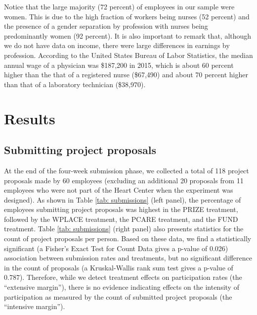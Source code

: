 \documentclass[12pt, titlepage]{article}
\begin{document}
Notice that the large majority (72 percent) of employees in our sample
were women. This is due to the high fraction of workers being nurses (52
percent) and the presence of a gender separation by profession with
nurses being predominantly women (92 percent). It is also important to
remark that, although we do not have data on income, there were large
differences in earnings by profession. According to the United States
Bureau of Labor Statistics, the median annual wage of a physician was
\$187,200 in 2015, which is about 60 percent higher than the that of a
registered nurse (\$67,490) and about 70 percent higher than that of a
laboratory technician (\$38,970).

\section{Results}\label{results}

\subsection{Submitting project
proposals}\label{submitting-project-proposals}

At the end of the four-week submission phase, we collected a total of
118 project proposals made by 60 employees (excluding an additional 20
proposals from 11 employees who were not part of the Heart Center when
the experiment was designed). As shown in Table \ref{tab: submissions}
(left panel), the percentage of employees submitting project proposals
was highest in the PRIZE treatment, followed by the WPLACE treatment,
the PCARE treatment, and the FUND treatment. Table
\ref{tab: submissions} (right panel) also presents statistics for the
count of project proposals per person. Based on these data, we find a
statistically significant (a Fisher's Exact Test for Count Data gives a
p-value of 0.026) association between submission rates and treatments,
but no significant difference in the count of proposals (a
Kruskal-Wallis rank sum test gives a p-value of 0.787). Therefore, while
we detect treatment effects on participation rates (the ``extensive
margin''), there is no evidence indicating effects on the intensity of
participation as measured by the count of submitted project proposals
(the ``intensive margin'').
\end{document}
